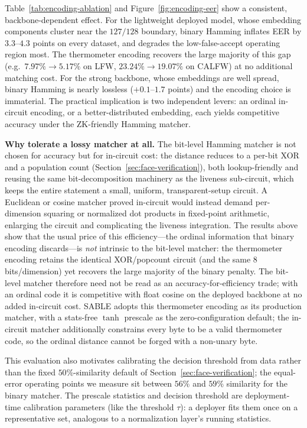 \documentclass[conference]{IEEEtran}
\begin{document}
Table~\ref{tab:encoding-ablation} and Figure~\ref{fig:encoding-eer} show a
consistent, backbone-dependent effect. For the lightweight deployed model, whose
embedding components cluster near the $127/128$ boundary, binary Hamming inflates
EER by $3.3$--$4.3$ points on every dataset, and degrades the low-false-accept
operating region most. The thermometer encoding recovers the large majority of
this gap (e.g.\ $7.97\% \to 5.17\%$ on LFW, $23.24\% \to 19.07\%$ on CALFW) at no
additional matching cost. For the strong backbone, whose embeddings are well
spread, binary Hamming is nearly lossless ($+0.1$--$1.7$ points) and the encoding
choice is immaterial. The practical implication is two independent levers: an
ordinal in-circuit encoding, or a better-distributed embedding, each yields
competitive accuracy under the ZK-friendly Hamming matcher.

\textbf{Why tolerate a lossy matcher at all.} The bit-level Hamming matcher is
not chosen for accuracy but for in-circuit cost: the distance reduces to a
per-bit XOR and a population count (Section~\ref{sec:face-verification}), both
lookup-friendly and reusing the same bit-decomposition machinery as the liveness
sub-circuit, which keeps the entire statement a small, uniform, transparent-setup
circuit. A Euclidean or cosine matcher proved in-circuit would instead demand
per-dimension squaring or normalized dot products in fixed-point arithmetic,
enlarging the circuit and complicating the liveness integration. The results
above show that the usual price of this efficiency---the ordinal information that
binary encoding discards---is \emph{not} intrinsic to the bit-level matcher: the
thermometer encoding retains the identical XOR/popcount circuit (and the same
$8$\,bits/dimension) yet recovers the large majority of the binary penalty. The
bit-level matcher therefore need not be read as an accuracy-for-efficiency trade;
with an ordinal code it is competitive with float cosine on the deployed backbone
at no added in-circuit cost. SABLE adopts this thermometer encoding as its
production matcher, with a stats-free $\tanh$ prescale as the zero-configuration
default; the in-circuit matcher additionally constrains every byte to be a valid
thermometer code, so the ordinal distance cannot be forged with a non-unary byte.

This evaluation also motivates calibrating the decision threshold from data
rather than the fixed $50\%$-similarity default of
Section~\ref{sec:face-verification}; the equal-error operating points we measure
sit between $56\%$ and $59\%$ similarity for the binary matcher. The prescale
statistics and decision threshold are deployment-time calibration parameters
(like the threshold $\tau$): a deployer fits them once on a representative set,
analogous to a normalization layer's running statistics.
\end{document}
